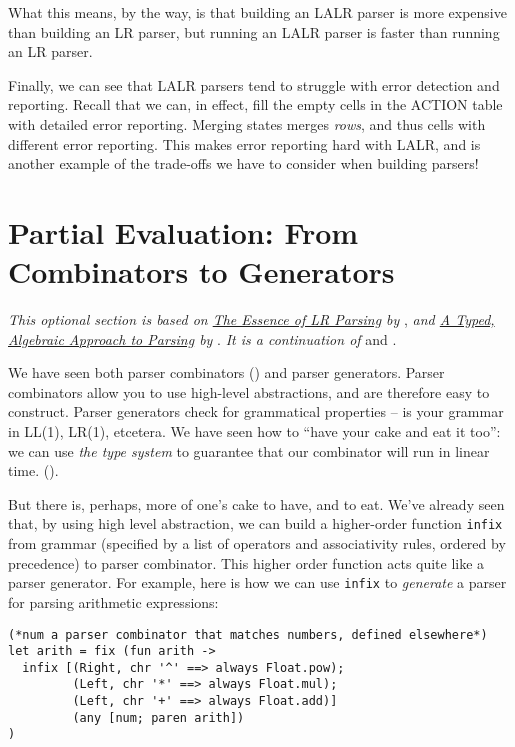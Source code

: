 What this means, by the way, is that building an LALR parser is more expensive than building an LR parser, but running an LALR parser is faster than running an LR parser.

Finally, we can see that LALR parsers tend to struggle with error detection and reporting. Recall that we can, in effect, fill the empty cells in the ACTION table with detailed error reporting. Merging states merges \textit{rows}, and thus cells with different error reporting. This makes error reporting hard with LALR, and is another example of the trade-offs we have to consider when building parsers!

\section{Partial Evaluation: From Combinators to Generators\optional}\label{section:partial-evaluation}
\textit{This optional section is based on \href{https://dl.acm.org/doi/pdf/10.1145/215465.215579}{The Essence of LR Parsing} by} \citet{sperber-1995}, \textit{and \href{https://www.cl.cam.ac.uk/~jdy22/papers/a-typed-algebraic-approach-to-parsing.pdf}{A Typed, Algebraic Approach to Parsing} by} \citet{krishnaswami-2019}. \textit{It is a continuation of}  and .

We have seen both parser combinators () and parser generators. Parser combinators allow you to use high-level abstractions, and are therefore easy to construct. Parser generators check for grammatical properties -- is your grammar in LL(1), LR(1), etcetera. We have seen how to ``have your cake and eat it too'': we can use \textit{the type system} to guarantee that our combinator will run in linear time. (). 

But there is, perhaps, more of one's cake to have, and to eat. We've already seen that, by using high level abstraction, we can build a higher-order function \texttt{infix} from grammar (specified by a list of operators and associativity rules, ordered by precedence) to parser combinator. This higher order function acts quite like a parser generator. For example, here is how we can use \texttt{infix} to \textit{generate} a parser for parsing arithmetic expressions:

\begin{verbatim}
(*num a parser combinator that matches numbers, defined elsewhere*)
let arith = fix (fun arith ->
  infix [(Right, chr '^' ==> always Float.pow);
         (Left, chr '*' ==> always Float.mul);
         (Left, chr '+' ==> always Float.add)]
         (any [num; paren arith])
)
\end{verbatim}


